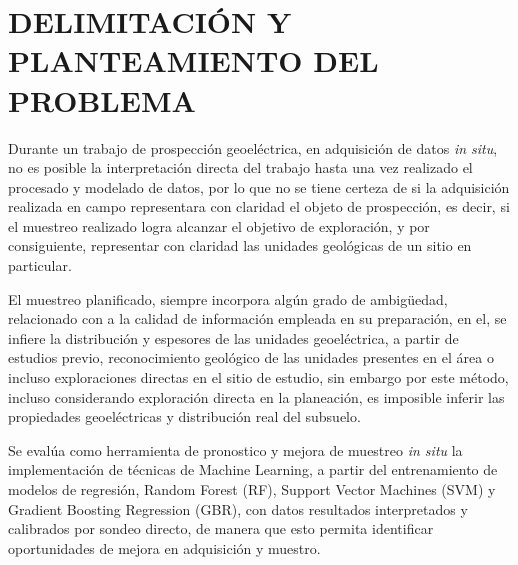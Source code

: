 \chapter{DELIMITACIÓN Y PLANTEAMIENTO DEL PROBLEMA}

Durante un trabajo de prospección geoeléctrica, en adquisición de datos \textit{in situ}, no es posible la interpretación directa del trabajo hasta una vez realizado el procesado y modelado de datos, por lo que no se tiene certeza de si la adquisición realizada en campo representara con claridad el objeto de prospección, es decir, si el muestreo realizado logra alcanzar el objetivo de exploración, y por consiguiente, representar con claridad las unidades geológicas de un sitio en particular.

El muestreo planificado, siempre incorpora algún grado de ambigüedad, relacionado con a la calidad de información empleada en su preparación, en el, se infiere la distribución y espesores de las unidades geoeléctrica, a partir de estudios previo, reconocimiento geológico de las unidades presentes en el área o incluso exploraciones directas en el sitio de estudio, sin embargo por este método, incluso considerando exploración directa en la planeación, es imposible inferir las propiedades geoeléctricas y distribución real del subsuelo.  

Se evalúa como herramienta de pronostico y mejora de muestreo \textit{in situ} la implementación de técnicas de Machine Learning, a partir del entrenamiento de modelos de regresión, Random Forest (RF), Support Vector Machines (SVM) y Gradient Boosting Regression (GBR), con datos resultados  interpretados y calibrados por sondeo directo, de manera que esto permita identificar oportunidades de mejora en adquisición y muestro.


  
     